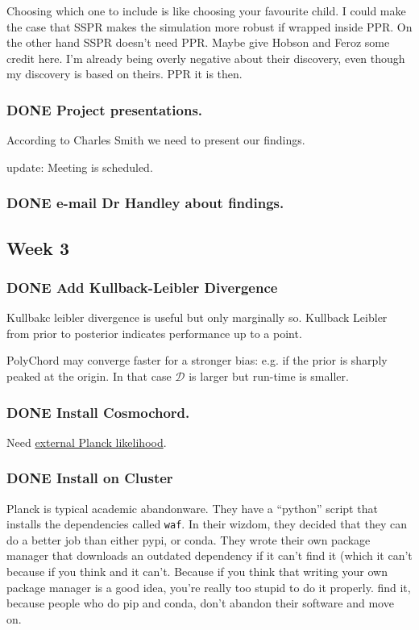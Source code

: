 \documentclass[11pt]{article}
\begin{document}
Choosing which one to include is like choosing your favourite
child. I could make the case that SSPR makes the simulation more
robust if wrapped inside PPR. On the other hand SSPR doesn't need
PPR. Maybe give Hobson and Feroz some credit here. I'm already
being overly negative about their discovery, even though my
discovery is based on theirs. PPR it is then. 

\subsubsection{{\bfseries\sffamily DONE} Project presentations.}
\label{sec:org20c439b}
According to Charles Smith we need to present our findings. 

update: Meeting is scheduled. 

\subsubsection{{\bfseries\sffamily DONE} e-mail Dr Handley about findings.}
\label{sec:org0d96bbd}

\subsection{Week 3}
\label{sec:orgc89ba1a}

\subsubsection{{\bfseries\sffamily DONE} Add Kullback-Leibler Divergence}
\label{sec:org656621a}
Kullbakc leibler divergence is useful but only marginally
so. Kullback Leibler from prior to posterior indicates performance
up to a point. 

PolyChord may converge faster for a stronger bias: e.g. if the
prior is sharply peaked at the origin. In that case
\(\mathcal{D}\) is larger but run-time is smaller.





\subsubsection{{\bfseries\sffamily DONE} Install Cosmochord.}
\label{sec:orga3b9b13}
Need \href{https://cosmologist.info/cosmomc/readme\_planck.html}{external Planck likelihood}. 

\subsubsection{{\bfseries\sffamily DONE} Install on Cluster}
\label{sec:org31e00bf}
Planck is typical academic abandonware. They have a ``python''
script that installs the dependencies called \texttt{waf}. In their
wizdom, they decided that they can do a better job than either
pypi, or conda. They wrote their own package manager that
downloads an outdated dependency if it can't find it (which it
can't because if you think and it can't. Because if you think
that writing your own package manager is a good idea, you're
really too stupid to do it properly.  find it, because people who
do pip and conda, don't abandon their software and move on.
\end{document}
